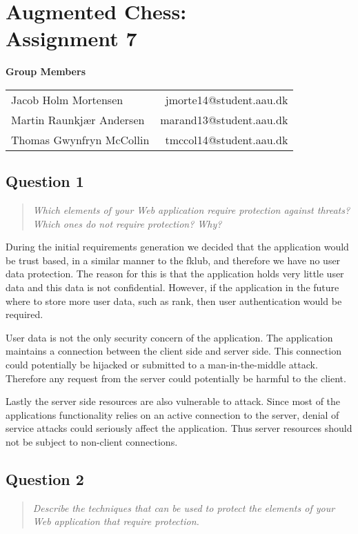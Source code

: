 \documentclass[10pt,a4paper]{report}
\begin{document}
\chapter{Augmented Chess:\\ Assignment 7}

\begin{center}
{\Large \textbf{Group Members}}

\begin{tabular}{l r}
Jacob Holm Mortensen            &       jmorte14@student.aau.dk\\
Martin Raunkjær Andersen        &       marand13@student.aau.dk\\
Thomas Gwynfryn McCollin        &       tmccol14@student.aau.dk
\end{tabular}
\end{center}

\section{Question 1}
\begin{quote}
\textit{Which elements of your Web application require protection against threats? Which ones do not require protection? Why?}
\end{quote}

During the initial requirements generation we decided that the application would be trust based, in a similar manner to the fklub, and therefore we have no user data protection. The reason for this is that the application holds very little user data and this data is not confidential. However, if the application in the future where to store more user data, such as rank, then user authentication would be required.

User data is not the only security concern of the application. The application maintains a connection between the client side and server side. This connection could potentially be hijacked or submitted to a man-in-the-middle attack. Therefore any request from the server could potentially be harmful to the client.

Lastly the server side resources are also vulnerable to attack. Since most of the applications functionality relies on an active connection to the server, denial of service attacks could seriously affect the application. Thus server resources should not be subject to non-client connections.

\section{Question 2}
\begin{quote}
\textit{Describe the techniques that can be used to protect the elements of your Web application that require protection.}
\end{quote}
\end{document}
